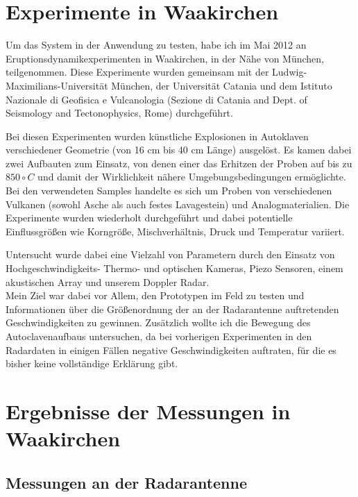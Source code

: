 \documentclass[12pt,a4paper]{scrartcl}
\begin{document}
\section{Experimente in Waakirchen}

Um das System in der Anwendung zu testen, habe ich im Mai 2012 an Eruptionsdynamikexperimenten in Waakirchen, in der Nähe von München, teilgenommen. Diese Experimente wurden gemeinsam mit der Ludwig-Maximilians-Universität München, der Universität Catania und dem Istituto Nazionale di Geofisica e Vulcanologia (Sezione di Catania and Dept. of Seismology and Tectonophysics, Rome) durchgeführt. 

Bei diesen Experimenten wurden künstliche Explosionen in Autoklaven \citep{Spieler:2004fk} verschiedener Geometrie (von 16 cm bis 40 cm Länge) ausgelöst. Es kamen dabei zwei Aufbauten zum Einsatz, von denen einer das Erhitzen der Proben auf bis zu $850\circ C$ und damit der Wirklichkeit nähere Umgebungsbedingungen ermöglichte. Bei den verwendeten Samples handelte es sich um Proben von verschiedenen Vulkanen (sowohl Asche als auch festes Lavagestein) und Analogmaterialien.
Die Experimente wurden wiederholt durchgeführt und dabei potentielle Einflussgrößen wie Korngröße, Mischverhältnis, Druck und Temperatur variiert.

Untersucht wurde dabei eine Vielzahl von Parametern durch den Einsatz von Hochgeschwindigkeits- Thermo- und optischen Kameras, Piezo Sensoren, einem akustischen Array und unserem Doppler Radar.\\

Mein Ziel war dabei vor Allem, den Prototypen im Feld zu testen und Informationen über die Größenordnung der an der Radarantenne auftretenden Geschwindigkeiten zu gewinnen. Zusätzlich wollte ich die Bewegung des Autoclavenaufbaus untersuchen, da bei vorherigen Experimenten in den Radardaten in einigen Fällen negative Geschwindigkeiten auftraten, für die es bisher keine vollständige Erklärung gibt. 


\section{Ergebnisse der Messungen in Waakirchen}

\subsection{Messungen an der Radarantenne}
\end{document}
